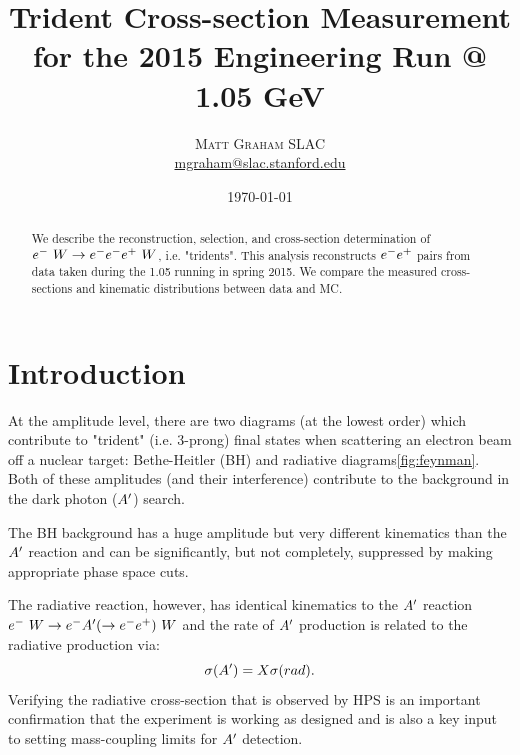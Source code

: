 \documentclass[twoside]{article}
\title{\vspace{-15mm}\fontsize{24pt}{10pt}\selectfont\textbf{Trident Cross-section Measurement for the 2015 Engineering Run @ 1.05 GeV}} %
\author{
\large
\textsc{Matt Graham} %
\normalsize SLAC\\ %
\normalsize \href{mailto:mgraham@slac.stanford.edu}{mgraham@slac.stanford.edu} %
\vspace{0mm}
}
\date{\today}
\begin{document}
\maketitle %

\thispagestyle{fancy} %


\begin{abstract}
We describe the reconstruction, selection, and cross-section determination of $e^-~W\to e^-e^-e^+~W$, i.e. "tridents".  This analysis reconstructs $e^-e^+$ pairs from data taken during the 1.05 \gev running in spring 2015.  We compare the measured cross-sections and kinematic distributions between data and MC. 
\noindent %
\end{abstract}



\section{Introduction}

At the amplitude level, there are two diagrams (at the lowest order) which contribute to "trident" (i.e. 3-prong) final states when scattering an electron beam off a nuclear target:  Bethe-Heitler (BH) and radiative diagrams\ref{fig:feynman}.  Both of these amplitudes (and their interference) contribute to the background in the dark photon ($A^\prime$) search.  

The BH background has a huge amplitude but very different kinematics than the $A^\prime$ reaction and can be significantly, but not completely, suppressed by making appropriate phase space cuts.

The radiative reaction, however, has identical kinematics to the $A^\prime$ reaction 
$e^-~W\to e^-A^\prime(\to e^-e^+)~W$ and the rate of $A^\prime$ production is related to the radiative production via: 
\begin{equation}
\sigma(A^\prime)=X \sigma(rad).
\end{equation}
Verifying the radiative cross-section that is observed by HPS is an important confirmation that the experiment is working as designed and is also a key input to setting mass-coupling limits for $A^\prime$ detection.  
\end{document}
